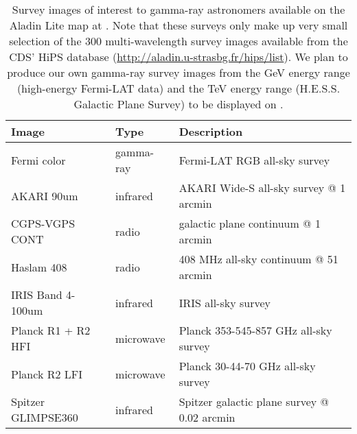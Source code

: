 \begin{table}[bt]

\caption{
Survey images of interest to gamma-ray astronomers available on the Aladin Lite map at \gammasky . Note that these surveys only make up very small selection of the 300 multi-wavelength survey images available from the CDS' HiPS database (\protect\url{http://aladin.u-strasbg.fr/hips/list}). We plan to produce our own gamma-ray survey images from the GeV energy range (high-energy Fermi-LAT data) and the TeV energy range (H.E.S.S. Galactic Plane Survey) to be displayed on \gammasky .
}

\label{tab:images}
{}\begin{tabular}{ lll }
\hline
Image & Type & Description\\
\hline
Fermi color & gamma-ray & Fermi-LAT RGB all-sky survey\\
AKARI 90um & infrared & AKARI Wide-S all-sky survey @ 1 arcmin\\
CGPS-VGPS CONT & radio & galactic plane continuum @ 1 arcmin\\
Haslam 408 & radio & 408 MHz all-sky continuum @ 51 arcmin\\
IRIS Band 4-100um & infrared & IRIS all-sky survey\\
Planck R1 + R2 HFI & microwave & Planck 353-545-857 GHz all-sky survey\\
Planck R2 LFI & microwave & Planck 30-44-70 GHz all-sky survey\\
Spitzer GLIMPSE360 & infrared & Spitzer galactic plane survey @ 0.02 arcmin\\
\hline
\end{tabular}

\end{table}
